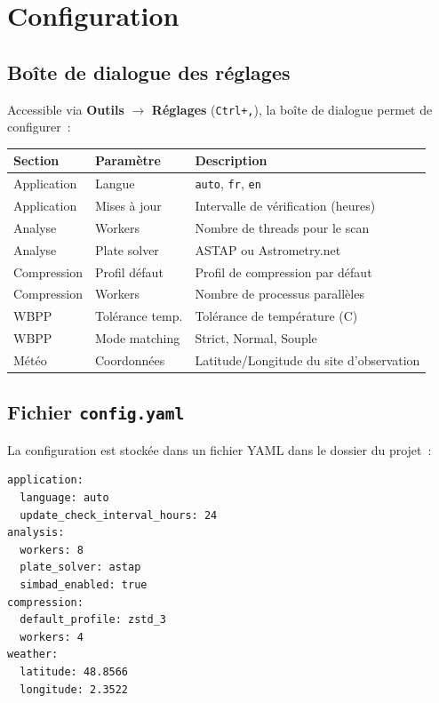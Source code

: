 \documentclass[a4paper,11pt]{article}
\begin{document}
\section{Configuration}
\label{sec:configuration}

\subsection{Bo\^{i}te de dialogue des r\'{e}glages}

Accessible via \textbf{Outils} $\rightarrow$ \textbf{R\'{e}glages} (\texttt{Ctrl+,}), la bo\^{i}te de dialogue permet de configurer~:

\begin{center}
\begin{tabularx}{\textwidth}{l l X}
\toprule
\textbf{Section} & \textbf{Param\`{e}tre} & \textbf{Description} \\
\midrule
Application & Langue & \texttt{auto}, \texttt{fr}, \texttt{en} \\
Application & Mises \`{a} jour & Intervalle de v\'{e}rification (heures) \\
Analyse & Workers & Nombre de threads pour le scan \\
Analyse & Plate solver & ASTAP ou Astrometry.net \\
Compression & Profil d\'{e}faut & Profil de compression par d\'{e}faut \\
Compression & Workers & Nombre de processus parall\`{e}les \\
WBPP & Tol\'{e}rance temp. & Tol\'{e}rance de temp\'{e}rature (\textdegree{}C) \\
WBPP & Mode matching & Strict, Normal, Souple \\
M\'{e}t\'{e}o & Coordonn\'{e}es & Latitude/Longitude du site d'observation \\
\bottomrule
\end{tabularx}
\end{center}

\subsection{Fichier \texttt{config.yaml}}

La configuration est stock\'{e}e dans un fichier YAML dans le dossier du projet~:

\begin{lstlisting}[title=Exemple de config.yaml]
application:
  language: auto
  update_check_interval_hours: 24
analysis:
  workers: 8
  plate_solver: astap
  simbad_enabled: true
compression:
  default_profile: zstd_3
  workers: 4
weather:
  latitude: 48.8566
  longitude: 2.3522
\end{lstlisting}
\end{document}
